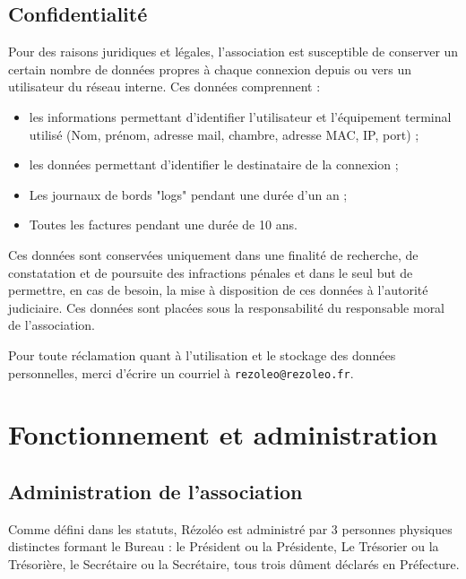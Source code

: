 \documentclass[12pt, a4paper]{article}
\begin{document}
	\subsection{Confidentialité}

	Pour des raisons juridiques et légales, l'association est susceptible de
	conserver un certain nombre de données propres à chaque connexion depuis ou
	vers un utilisateur du réseau interne. Ces données comprennent :

	\bigskip

	\begin{itemize}
		\item[\textbullet] les informations permettant d'identifier l'utilisateur et
			l'équipement terminal utilisé (Nom, prénom, adresse mail, chambre, adresse
			MAC, IP, port) ;

		\item[\textbullet] les données permettant d'identifier le destinataire de la
			connexion ;

		\item[\textbullet] Les journaux de bords "logs" pendant une durée d'un an ; 

		\item[\textbullet] Toutes les factures pendant une durée de 10 ans.
	\end{itemize}

	\bigskip

	Ces données sont conservées uniquement dans une finalité de recherche, de
	constatation et de poursuite des infractions pénales et dans le seul but de
	permettre, en cas de besoin, la mise à disposition de ces données à l'autorité
	judiciaire. Ces données sont placées sous la responsabilité du responsable moral
	de l'association.

	\bigskip

	Pour toute réclamation quant à l'utilisation et le stockage des données
	personnelles, merci d'écrire un courriel à \nolinkurl{rezoleo@rezoleo.fr}.

	\section{Fonctionnement et administration}

	\subsection{Administration de l'association}

	Comme défini dans les statuts, Rézoléo est administré par 3 personnes
	physiques distinctes formant le Bureau : le Président ou la Présidente, Le Trésorier
	ou la Trésorière, le Secrétaire ou la Secrétaire, tous trois dûment déclarés en
	Préfecture.
\end{document}
